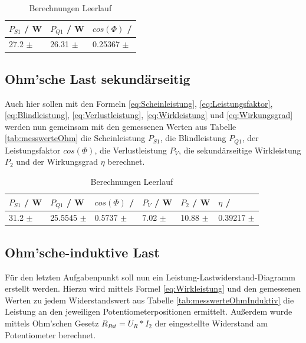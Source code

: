 \documentclass[12pt,a4paper,twoside]{article}
\begin{document}
\begin{table}[H]
    \centering
    \caption{Berechnungen Leerlauf}
    \label{tab:BerechnungenLeerlauf}
    \begin{tabular}{| l | l | l |}
        \hline
        $P_{S1}$ / W & $P_{Q1}$ / W & $cos(\Phi)$ / \\
        \hline
        27.2 $\pm$  & 26.31 $\pm$  & 0.25367 $\pm$  \\
        \hline
    \end{tabular}
\end{table}


\subsection{Ohm'sche Last sekundärseitig}

Auch hier sollen mit den Formeln \ref{eq:Scheinleistung}, \ref{eq:Leistungsfaktor}, \ref{eq:Blindleistung}, \ref{eq:Verlustleistung}, \ref{eq:Wirkleistung} und \ref{eq:Wirkungsgrad} werden nun gemeinsam mit den gemessenen Werten aus Tabelle \ref{tab:messwerteOhm} die Scheinleistung $P_{S1}$, die Blindleistung $P_{Q1}$, der Leistungsfaktor $cos(\Phi)$, die Verlustleistung $P_{V}$, die sekundärseitige Wirkleistung $P_{2}$ und der Wirkungsgrad $\eta$ berechnet.

\begin{table}[H]
    \centering
    \caption{Berechnungen Leerlauf}
    \label{tab:BerechnungenLeerlauf}
    \begin{tabular}{| l | l | l | l | l | l |}
        \hline
        $P_{S1}$ / W & $P_{Q1}$ / W & $cos(\Phi)$ / & $P_{V}$ / W & $P_{2}$ / W & $\eta$ / \\
        \hline
        31.2 $\pm$  & 25.5545 $\pm$  & 0.5737 $\pm$  & 7.02 $\pm$  & 10.88 $\pm$  & 0.39217 $\pm$   \\
        \hline
    \end{tabular}
\end{table}


\subsection{Ohm'sche-induktive Last}

Für den letzten Aufgabenpunkt soll nun ein Leistung-Lastwiderstand-Diagramm erstellt werden. Hierzu wird mittels Formel \ref{eq:Wirkleistung} und den gemessenen Werten zu jedem Widerstandswert aus Tabelle \ref{tab:messwerteOhmInduktiv} die Leistung an den jeweiligen Potentiometerpositionen ermittelt.
Außerdem wurde mittels Ohm'schen Gesetz $R_{Pot} = U_{R}*I_{2}$ der eingestellte Widerstand am Potentiometer berechnet.
\end{document}
